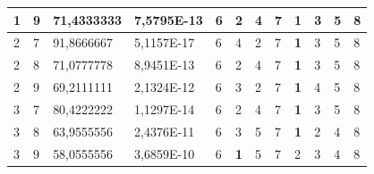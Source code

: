 \documentclass[conference]{IEEEtran}
\begin{document}
\begin{table}[]
\begin{tabular}{|llll|llllllll|}
		\multicolumn{1}{|l|}{1}   & \multicolumn{1}{l|}{9}         & \multicolumn{1}{l|}{71,4333333}    & 7,5795E-13 & \multicolumn{1}{l|}{6}   & \multicolumn{1}{l|}{2}          & \multicolumn{1}{l|}{4}          & \multicolumn{1}{l|}{7}   & \multicolumn{1}{l|}{\textbf{1}} & \multicolumn{1}{l|}{3}          & \multicolumn{1}{l|}{5}          & 8                      \\ \hline
		\multicolumn{1}{|l|}{2}   & \multicolumn{1}{l|}{7}         & \multicolumn{1}{l|}{91,8666667}    & 5,1157E-17 & \multicolumn{1}{l|}{6}   & \multicolumn{1}{l|}{4}          & \multicolumn{1}{l|}{2}          & \multicolumn{1}{l|}{7}   & \multicolumn{1}{l|}{\textbf{1}} & \multicolumn{1}{l|}{3}          & \multicolumn{1}{l|}{5}          & 8                      \\ \hline
		\multicolumn{1}{|l|}{2}   & \multicolumn{1}{l|}{8}         & \multicolumn{1}{l|}{71,0777778}    & 8,9451E-13 & \multicolumn{1}{l|}{6}   & \multicolumn{1}{l|}{2}          & \multicolumn{1}{l|}{4}          & \multicolumn{1}{l|}{7}   & \multicolumn{1}{l|}{\textbf{1}} & \multicolumn{1}{l|}{3}          & \multicolumn{1}{l|}{5}          & 8                      \\ \hline
		\multicolumn{1}{|l|}{2}   & \multicolumn{1}{l|}{9}         & \multicolumn{1}{l|}{69,2111111}    & 2,1324E-12 & \multicolumn{1}{l|}{6}   & \multicolumn{1}{l|}{3}          & \multicolumn{1}{l|}{2}          & \multicolumn{1}{l|}{7}   & \multicolumn{1}{l|}{\textbf{1}} & \multicolumn{1}{l|}{4}          & \multicolumn{1}{l|}{5}          & 8                      \\ \hline
		\multicolumn{1}{|l|}{3}   & \multicolumn{1}{l|}{7}         & \multicolumn{1}{l|}{80,4222222}    & 1,1297E-14 & \multicolumn{1}{l|}{6}   & \multicolumn{1}{l|}{2}          & \multicolumn{1}{l|}{4}          & \multicolumn{1}{l|}{7}   & \multicolumn{1}{l|}{\textbf{1}} & \multicolumn{1}{l|}{3}          & \multicolumn{1}{l|}{5}          & 8                      \\ \hline
		\multicolumn{1}{|l|}{3}   & \multicolumn{1}{l|}{8}         & \multicolumn{1}{l|}{63,9555556}    & 2,4376E-11 & \multicolumn{1}{l|}{6}   & \multicolumn{1}{l|}{3}          & \multicolumn{1}{l|}{5}          & \multicolumn{1}{l|}{7}   & \multicolumn{1}{l|}{\textbf{1}} & \multicolumn{1}{l|}{2}          & \multicolumn{1}{l|}{4}          & 8                      \\ \hline
		\multicolumn{1}{|l|}{3}   & \multicolumn{1}{l|}{9}         & \multicolumn{1}{l|}{58,0555556}    & 3,6859E-10 & \multicolumn{1}{l|}{6}   & \multicolumn{1}{l|}{\textbf{1}} & \multicolumn{1}{l|}{5}          & \multicolumn{1}{l|}{7}   & \multicolumn{1}{l|}{2}          & \multicolumn{1}{l|}{3}          & \multicolumn{1}{l|}{4}          & 8                      \\ \hline

\end{tabular}
\end{table}
\end{document}
